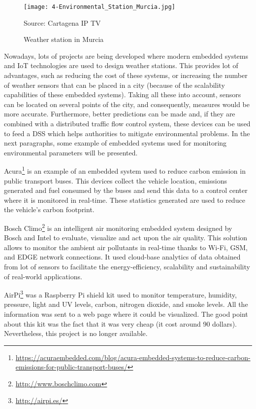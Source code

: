\begin{figure}[!h]
	\begin{center}
		\texttt{[image: 4-Environmental\_Station\_Murcia.jpg]}
		\caption{Weather station in Murcia}
		\label{fig:4-Environmental_Station_Murcia}{Source: Cartagena IP TV}
	\end{center}
\end{figure}

Nowadays, lots of projects are being developed where modern embedded systems and IoT technologies are used to design weather stations. This provides lot of advantages, such as reducing the cost of these systems, or increasing the number of weather sensors that can be placed in a city (because of the scalability capabilities of these embedded systems). Taking all these into account, sensors can be located on several points of the city, and consequently, measures would be more accurate. Furthermore, better predictions can be made and, if they are combined with a distributed traffic flow control system, these devices can be used to feed a \ac{DSS} which helps authorities to mitigate environmental problems. In the next paragraphs, some example of embedded systems used for monitoring environmental parameters will be presented.

Acura\footnote{\url{https://acuraembedded.com/blog/acura-embedded-systems-to-reduce-carbon-emissions-for-public-transport-buses/}} is an example of an embedded system used to reduce carbon emission in public transport buses. This devices collect the vehicle location, emissions generated and fuel consumed by the buses and send this data to a control center where it is monitored in real-time. These statistics generated are used to reduce the vehicle's carbon footprint.

Bosch Climo\footnote{\url{http://www.boschclimo.com}} is an intelligent air monitoring embedded system designed by Bosch and Intel to evaluate, visualize and act upon the air quality. This solution allows to monitor the ambient air pollutants in real-time thanks to Wi-Fi, GSM, and EDGE network connections. It used cloud-base analytics of data obtained from lot of sensors to facilitate the energy-efficiency, scalability and sustainability of real-world applications.


AirPi\footnote{\url{http://airpi.es/}} was a Raspberry Pi shield kit used to monitor temperature, humidity, pressure, light and UV levels, carbon, nitrogen dioxide, and smoke levels. All the information was sent to a web page where it could be visualized. The good point about this kit was the fact that it was very cheap (it cost around 90 dollars).  Nevertheless, this project is no longer available.




